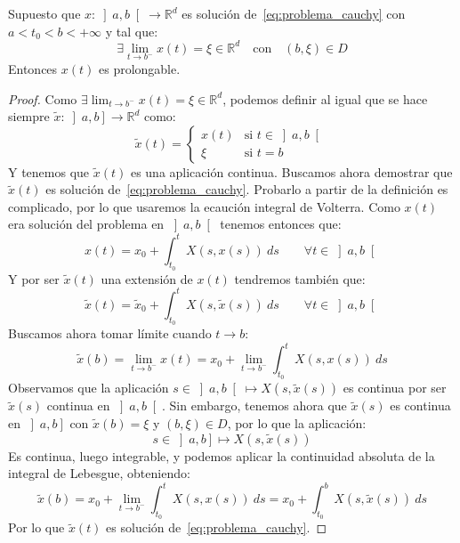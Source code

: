 \begin{lema}\label{lema:1extremos}
    Supuesto que $x:\left]a,b\right[\to \mathbb{R}^d$ es solución de~\eqref{eq:problema_cauchy} con $a<t_0<b<+\infty$ y tal que:
    \begin{equation*}
        \exists \lim_{t\to b^-} x(t) = \xi \in \mathbb{R}^d \quad \text{con} \quad (b,\xi) \in D
    \end{equation*}
    Entonces $x(t)$ es prolongable.
    \begin{proof}
        Como $\exists \lim_{t\to b^-}x(t) = \xi\in \mathbb{R}^d$, podemos definir al igual que se hace siempre $\tilde{x}:\left]a,b\right]\to \mathbb{R}^d$ como:
        \begin{equation*}
            \tilde{x}(t) = \left\{\begin{array}{ll}
                x(t) & \text{si\ } t\in \left]a,b\right[ \\
                \xi & \text{si\ } t = b
            \end{array}\right. 
        \end{equation*}
        Y tenemos que $\tilde{x}(t)$ es una aplicación continua. Buscamos ahora demostrar que $\tilde{x}(t)$ es solución de~\eqref{eq:problema_cauchy}. Probarlo a partir de la definición es complicado, por lo que usaremos la ecaución integral de Volterra. Como $x(t)$ era solución del problema en $\left]a,b\right[$ tenemos entonces que:
        \begin{equation*}
            x(t) = x_0 + \int_{t_0}^{t} X(s,x(s))~ds \qquad \forall t\in \left]a,b\right[
        \end{equation*}
        Y por ser $\tilde{x}(t)$ una extensión de $x(t)$ tendremos también que:
        \begin{equation*}
            \tilde{x}(t) = \tilde{x}_0 + \int_{t_0}^{t} X(s,\tilde{x}(s))~ds \qquad \forall t\in \left]a,b\right[
        \end{equation*}
        Buscamos ahora tomar límite cuando $t\to b$:
        \begin{equation*}
            \tilde{x}(b) = \lim_{t\to b^-}x(t) = x_0 + \lim_{t\to b^-}\int_{t_0}^{t} X(s,x(s))~ds
        \end{equation*}
        Observamos que la aplicación $s\in \left]a,b\right[\mapsto X(s,\tilde{x}(s))$ es continua por ser $\tilde{x}(s)$ continua en $\left]a,b\right[$. Sin embargo, tenemos ahora que $\tilde{x}(s)$ es continua en $\left]a,b\right]$ con $\tilde{x}(b) = \xi$ y $(b,\xi)\in D$, por lo que la aplicación:
        \begin{equation*}
            s\in \left]a,b\right] \mapsto  X(s,\tilde{x}(s))
        \end{equation*}
        Es continua, luego integrable, y podemos aplicar la continuidad absoluta de la integral de Lebesgue, obteniendo:
        \begin{equation*}
            \tilde{x}(b) = x_0 + \lim_{t\to b^-}\int_{t_0}^{t} X(s,x(s))~ds = x_0 + \int_{t_0}^{b} X(s,\tilde{x}(s))~ds 
        \end{equation*}
        Por lo que $\tilde{x}(t)$ es solución de~\eqref{eq:problema_cauchy}.
    \end{proof}
\end{lema}

